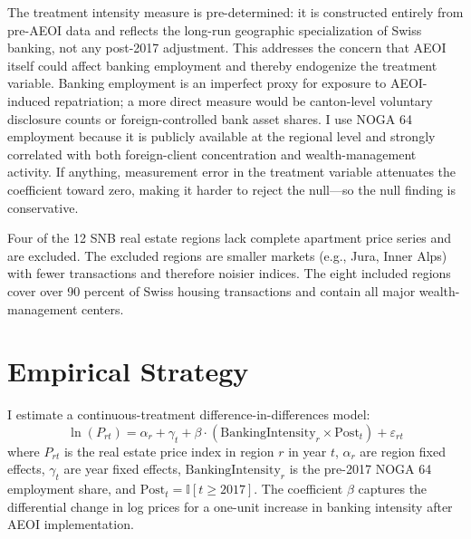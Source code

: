 \documentclass[12pt]{article}
\newcommand{\ind}{\mathbb{I}}
\begin{document}
The treatment intensity measure is pre-determined: it is constructed entirely from pre-AEOI data and reflects the long-run geographic specialization of Swiss banking, not any post-2017 adjustment. This addresses the concern that AEOI itself could affect banking employment and thereby endogenize the treatment variable. Banking employment is an imperfect proxy for exposure to AEOI-induced repatriation; a more direct measure would be canton-level voluntary disclosure counts or foreign-controlled bank asset shares. I use NOGA 64 employment because it is publicly available at the regional level and strongly correlated with both foreign-client concentration and wealth-management activity. If anything, measurement error in the treatment variable attenuates the coefficient toward zero, making it harder to reject the null---so the null finding is conservative.

Four of the 12 SNB real estate regions lack complete apartment price series and are excluded. The excluded regions are smaller markets (e.g., Jura, Inner Alps) with fewer transactions and therefore noisier indices. The eight included regions cover over 90 percent of Swiss housing transactions and contain all major wealth-management centers.




\section{Empirical Strategy}
\label{sec:strategy}

I estimate a continuous-treatment difference-in-differences model:
\begin{equation}
\ln(P_{rt}) = \alpha_r + \gamma_t + \beta \cdot (\text{BankingIntensity}_r \times \text{Post}_t) + \varepsilon_{rt}
\label{eq:main}
\end{equation}
where $P_{rt}$ is the real estate price index in region $r$ in year $t$, $\alpha_r$ are region fixed effects, $\gamma_t$ are year fixed effects, $\text{BankingIntensity}_r$ is the pre-2017 NOGA 64 employment share, and $\text{Post}_t = \ind[t \geq 2017]$. The coefficient $\beta$ captures the differential change in log prices for a one-unit increase in banking intensity after AEOI implementation.
\end{document}
